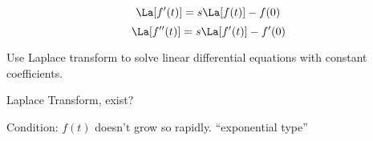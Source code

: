 \begin{equation*}
	\La[f'(t)] = s\La[f(t)] - f(0)
\end{equation*}
\begin{equation*}
	\La[f''(t)] = s\La[f'(t)] - f'(0)
\end{equation*}

Use Laplace transform to solve linear differential equations with constant coefficients.

Laplace Transform, exist?

Condition: \(f(t)\) doesn't grow so rapidly. ``exponential type''



